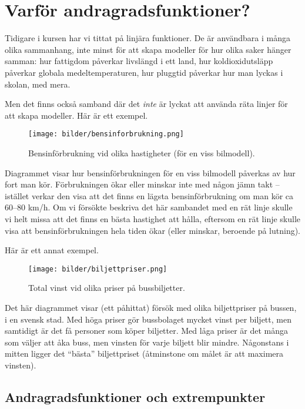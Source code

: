 \section{Varför andragradsfunktioner?}

Tidigare i kursen har vi tittat på linjära funktioner.
De är användbara i många olika sammanhang, inte minst för att skapa modeller för hur olika saker hänger samman:
hur fattigdom påverkar livslängd i ett land, hur koldioxidutsläpp påverkar globala medeltemperaturen, hur pluggtid påverkar hur man lyckas i skolan, med mera.

Men det finns också samband där det \emph{inte} är lyckat att använda räta linjer för att skapa modeller.
Här är ett exempel.

\begin{figure}
  \centering
  \texttt{[image: bilder/bensinforbrukning.png]}
  \caption{\label{fig:bensinförbrukning}Bensinförbrukning vid olika hastigheter (för en viss bilmodell).}
\end{figure}

Diagrammet visar hur bensinförbrukningen för en viss bilmodell påverkas av hur fort man kör.
Förbrukningen ökar eller minskar inte med någon jämn takt -- istället verkar den visa att det finns en lägsta bensinförbrukning om man kör ca 60--80 km/h.
Om vi försökte beskriva det här sambandet med en rät linje skulle vi helt missa att det finns en bästa hastighet att hålla, eftersom en rät linje skulle visa att bensinförbrukningen hela tiden ökar (eller minskar, beroende på lutning).

Här är ett annat exempel.

\begin{figure}
  \centering
  \texttt{[image: bilder/biljettpriser.png]}
  \caption{\label{fig:biljettpriser}Total vinst vid olika priser på bussbiljetter.}
\end{figure}

Det här diagrammet visar (ett påhittat) försök med olika biljettpriser på bussen, i en svensk stad.
Med höga priser gör bussbolaget mycket vinst per biljett, men samtidigt är det få personer som köper biljetter.
Med låga priser är det många som väljer att åka buss, men vinsten för varje biljett blir mindre.
Någonstans i mitten ligger det ``bästa'' biljettpriset (åtminstone om målet är att maximera vinsten).

\subsection {Andragradsfunktioner och extrempunkter}

